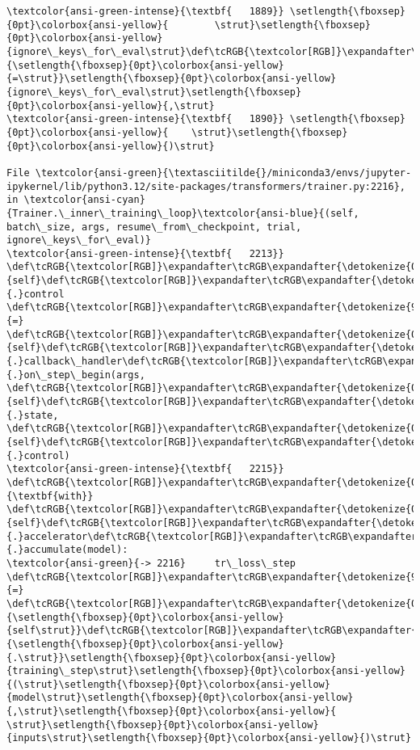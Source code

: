 \documentclass[11pt]{article}
\begin{document}
\begin{Verbatim}[commandchars=\\\{\}, frame=single, framerule=2mm, rulecolor=\color{outerrorbackground}]
\textcolor{ansi-green-intense}{\textbf{   1889}} \setlength{\fboxsep}{0pt}\colorbox{ansi-yellow}{        \strut}\setlength{\fboxsep}{0pt}\colorbox{ansi-yellow}{ignore\_keys\_for\_eval\strut}\def\tcRGB{\textcolor[RGB]}\expandafter\tcRGB\expandafter{\detokenize{98,98,98}}{\setlength{\fboxsep}{0pt}\colorbox{ansi-yellow}{=\strut}}\setlength{\fboxsep}{0pt}\colorbox{ansi-yellow}{ignore\_keys\_for\_eval\strut}\setlength{\fboxsep}{0pt}\colorbox{ansi-yellow}{,\strut}
\textcolor{ansi-green-intense}{\textbf{   1890}} \setlength{\fboxsep}{0pt}\colorbox{ansi-yellow}{    \strut}\setlength{\fboxsep}{0pt}\colorbox{ansi-yellow}{)\strut}

File \textcolor{ansi-green}{\textasciitilde{}/miniconda3/envs/jupyter-ipykernel/lib/python3.12/site-packages/transformers/trainer.py:2216}, in \textcolor{ansi-cyan}{Trainer.\_inner\_training\_loop}\textcolor{ansi-blue}{(self, batch\_size, args, resume\_from\_checkpoint, trial, ignore\_keys\_for\_eval)}
\textcolor{ansi-green-intense}{\textbf{   2213}}     \def\tcRGB{\textcolor[RGB]}\expandafter\tcRGB\expandafter{\detokenize{0,135,0}}{self}\def\tcRGB{\textcolor[RGB]}\expandafter\tcRGB\expandafter{\detokenize{98,98,98}}{.}control \def\tcRGB{\textcolor[RGB]}\expandafter\tcRGB\expandafter{\detokenize{98,98,98}}{=} \def\tcRGB{\textcolor[RGB]}\expandafter\tcRGB\expandafter{\detokenize{0,135,0}}{self}\def\tcRGB{\textcolor[RGB]}\expandafter\tcRGB\expandafter{\detokenize{98,98,98}}{.}callback\_handler\def\tcRGB{\textcolor[RGB]}\expandafter\tcRGB\expandafter{\detokenize{98,98,98}}{.}on\_step\_begin(args, \def\tcRGB{\textcolor[RGB]}\expandafter\tcRGB\expandafter{\detokenize{0,135,0}}{self}\def\tcRGB{\textcolor[RGB]}\expandafter\tcRGB\expandafter{\detokenize{98,98,98}}{.}state, \def\tcRGB{\textcolor[RGB]}\expandafter\tcRGB\expandafter{\detokenize{0,135,0}}{self}\def\tcRGB{\textcolor[RGB]}\expandafter\tcRGB\expandafter{\detokenize{98,98,98}}{.}control)
\textcolor{ansi-green-intense}{\textbf{   2215}} \def\tcRGB{\textcolor[RGB]}\expandafter\tcRGB\expandafter{\detokenize{0,135,0}}{\textbf{with}} \def\tcRGB{\textcolor[RGB]}\expandafter\tcRGB\expandafter{\detokenize{0,135,0}}{self}\def\tcRGB{\textcolor[RGB]}\expandafter\tcRGB\expandafter{\detokenize{98,98,98}}{.}accelerator\def\tcRGB{\textcolor[RGB]}\expandafter\tcRGB\expandafter{\detokenize{98,98,98}}{.}accumulate(model):
\textcolor{ansi-green}{-> 2216}     tr\_loss\_step \def\tcRGB{\textcolor[RGB]}\expandafter\tcRGB\expandafter{\detokenize{98,98,98}}{=} \def\tcRGB{\textcolor[RGB]}\expandafter\tcRGB\expandafter{\detokenize{0,135,0}}{\setlength{\fboxsep}{0pt}\colorbox{ansi-yellow}{self\strut}}\def\tcRGB{\textcolor[RGB]}\expandafter\tcRGB\expandafter{\detokenize{98,98,98}}{\setlength{\fboxsep}{0pt}\colorbox{ansi-yellow}{.\strut}}\setlength{\fboxsep}{0pt}\colorbox{ansi-yellow}{training\_step\strut}\setlength{\fboxsep}{0pt}\colorbox{ansi-yellow}{(\strut}\setlength{\fboxsep}{0pt}\colorbox{ansi-yellow}{model\strut}\setlength{\fboxsep}{0pt}\colorbox{ansi-yellow}{,\strut}\setlength{\fboxsep}{0pt}\colorbox{ansi-yellow}{ \strut}\setlength{\fboxsep}{0pt}\colorbox{ansi-yellow}{inputs\strut}\setlength{\fboxsep}{0pt}\colorbox{ansi-yellow}{)\strut}

\end{Verbatim}
\end{document}
